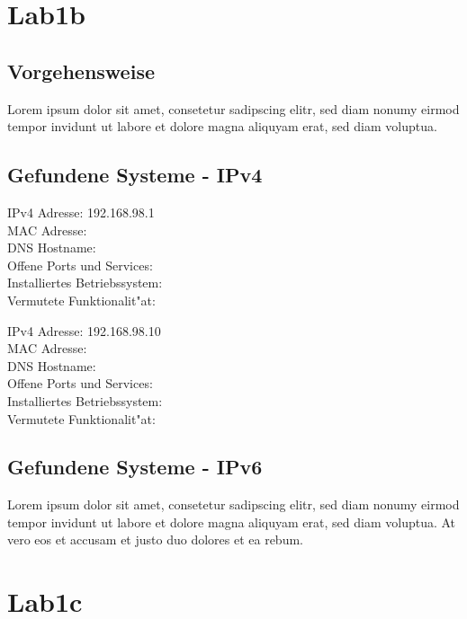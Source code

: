 \documentclass[12pt,a4paper,titlepage,oneside]{scrartcl}
\begin{document}
\section{Lab1b}

\subsection{Vorgehensweise}
Lorem ipsum dolor sit amet, consetetur sadipscing elitr, sed diam nonumy eirmod tempor invidunt ut labore et dolore magna aliquyam erat, sed diam voluptua. 

\subsection{Gefundene Systeme - IPv4}
\begin{description}
\item
IPv4 Adresse: 192.168.98.1\\
MAC Adresse:\\
DNS Hostname:\\
Offene Ports und Services:\\
Installiertes Betriebssystem:\\
Vermutete Funktionalit"at:\\
\item
IPv4 Adresse: 192.168.98.10\\
MAC Adresse:\\
DNS Hostname:\\
Offene Ports und Services:\\
Installiertes Betriebssystem:\\
Vermutete Funktionalit"at:\\
\end{description}

\subsection{Gefundene Systeme - IPv6}
Lorem ipsum dolor sit amet, consetetur sadipscing elitr, sed diam nonumy eirmod tempor invidunt ut labore et dolore magna aliquyam erat, sed diam voluptua. At vero eos et accusam et justo duo dolores et ea rebum.  

\section{Lab1c} 
\end{document}
